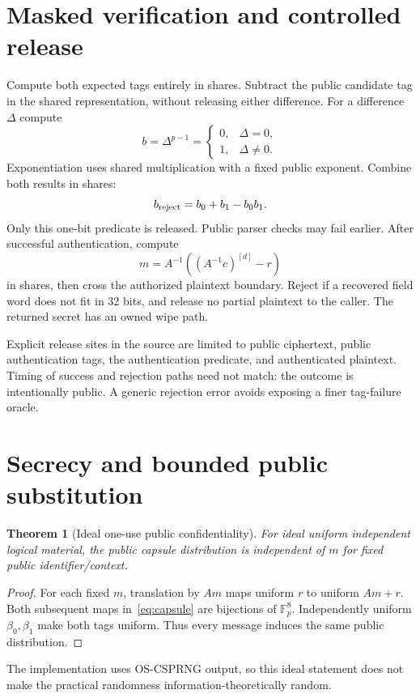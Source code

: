 \documentclass[11pt]{article}
\newtheorem{theorem}{Theorem}
\newcommand{\F}{\mathbb F_p}
\begin{document}
\section{Masked verification and controlled release}
Compute both expected tags entirely in shares. Subtract the public candidate
tag in the shared representation, without releasing either difference.
For a difference $\Delta$ compute
\[
b=\Delta^{p-1}=
\begin{cases}0,&\Delta=0,\\1,&\Delta\ne0.\end{cases}
\]
Exponentiation uses shared multiplication with a fixed public exponent.
Combine both results in shares:
\[
b_{\rm reject}=b_0+b_1-b_0b_1.
\]
Only this one-bit predicate is released. Public parser checks may fail
earlier. After successful authentication, compute
\[
 m=A^{-1}\left((A^{-1}c)^{[d]}-r\right)
\]
in shares, then cross the authorized plaintext boundary. Reject if a
recovered field word does not fit in 32 bits, and release no partial
plaintext to the caller. The returned secret has an owned wipe path.

Explicit release sites in the source are limited to public ciphertext,
public authentication tags, the authentication predicate, and authenticated
plaintext. Timing of success and rejection paths need not match:
the outcome is intentionally public. A generic rejection error avoids
exposing a finer tag-failure oracle.

\section{Secrecy and bounded public substitution}
\begin{theorem}[Ideal one-use public confidentiality]
For ideal uniform independent logical material, the public capsule
distribution is independent of $m$ for fixed public identifier/context.
\end{theorem}
\begin{proof}
For each fixed $m$, translation by $Am$ maps uniform $r$ to uniform
$Am+r$. Both subsequent maps in~\eqref{eq:capsule} are bijections of
$\F^8$. Independently uniform $\beta_0,\beta_1$ make both tags uniform.
Thus every message induces the same public distribution.
\end{proof}
The implementation uses OS-CSPRNG output, so this ideal statement does not
make the practical randomness information-theoretically random.
\end{document}
